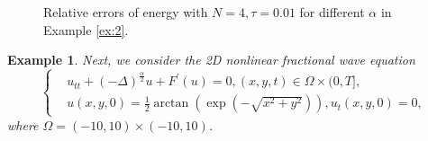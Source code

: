 \documentclass[preprint,compress,3p,10pt,fleqn]{elsarticle}
\numberwithin{equation}{section}
\newtheorem{expl}{Example}[section]
\newenvironment{example}{\begin{expl}\rm}{\end{expl}}
\begin{document}
\begin{figure}[H]
\begin{center}
{}\caption{ Relative errors of energy with $N=4, \tau=0.01$ for different $\alpha$ in Example \ref{ex:2}.}
\label{fig:2-4}
\end{center}
\end{figure}
	
\begin{example}\label{ex:3}
\cite{wangUnconditionalEnergyDissipation2021} Next, we consider the 2D nonlinear fractional wave equation
\begin{equation}
\begin{cases}
& u_{t t}+(-\Delta)^{\frac{\alpha}{2}} u+F^{\prime}(u)=0,(x, y, t) \in \Omega \times(0, T],\\
& u(x, y, 0)=\frac{1}{2} \arctan \left(\exp \left(-\sqrt{x^2+y^2}\right)\right), u_t(x, y, 0)=0,
\end{cases}
\end{equation}
where $\Omega=(-10,10) \times(-10,10)$.
\end{example}
\end{document}
